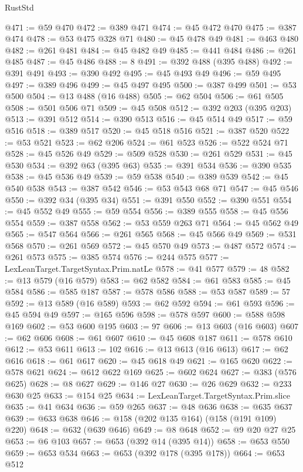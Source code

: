 \begin{lexlean}{RustStd}
\begin{coremodule}
@471 := @59 @470
@472 := @389 @471
@474 := @45 @472 @470
@475 := @387 @474
@478 := @53 @475 @328 @71
@480 := @45 @478 @49
@481 := @463 @480
@482 := @261 @481
@484 := @45 @482 @49
@485 := @441 @484
@486 := @261 @485
@487 := @45 @486
@488 := 8
@491 := @392 @488 (@395 @488)
@492 := @391 @491
@493 := @390 @492
@495 := @45 @493 @49
@496 := @59 @495
@497 := @389 @496
@499 := @45 @497 @495
@500 := @387 @499
@501 := @53 @500
@504 := @13 @488 (@16 @488)
@505 := @62 @504
@506 := @61 @505
@508 := @501 @506 @71
@509 := @45 @508
@512 := @392 @203 (@395 @203)
@513 := @391 @512
@514 := @390 @513
@516 := @45 @514 @49
@517 := @59 @516
@518 := @389 @517
@520 := @45 @518 @516
@521 := @387 @520
@522 := @53 @521
@523 := @62 @206
@524 := @61 @523
@526 := @522 @524 @71
@528 := @45 @526 @49
@529 := @509 @528
@530 := @261 @529
@531 := @45 @530
@534 := @392 @63 (@395 @63)
@535 := @391 @534
@536 := @390 @535
@538 := @45 @536 @49
@539 := @59 @538
@540 := @389 @539
@542 := @45 @540 @538
@543 := @387 @542
@546 := @53 @543 @68 @71
@547 := @45 @546
@550 := @392 @34 (@395 @34)
@551 := @391 @550
@552 := @390 @551
@554 := @45 @552 @49
@555 := @59 @554
@556 := @389 @555
@558 := @45 @556 @554
@559 := @387 @558
@562 := @53 @559 @263 @71
@564 := @45 @562 @49
@565 := @547 @564
@566 := @261 @565
@568 := @45 @566 @49
@569 := @531 @568
@570 := @261 @569
@572 := @45 @570 @49
@573 := @487 @572
@574 := @261 @573
@575 := @385 @574
@576 := @244 @575
@577 := LexLeanTarget.TargetSyntax.Prim.natLe
@578 := @41 @577
@579 := 48
@582 := @13 @579 (@16 @579)
@583 := @62 @582
@584 := @61 @583
@585 := @45 @584
@586 := @585 @187
@587 := @578 @586
@588 := @53 @587
@589 := 57
@592 := @13 @589 (@16 @589)
@593 := @62 @592
@594 := @61 @593
@596 := @45 @594 @49
@597 := @165 @596
@598 := @578 @597
@600 := @588 @598 @169
@602 := @53 @600 @195
@603 := 97
@606 := @13 @603 (@16 @603)
@607 := @62 @606
@608 := @61 @607
@610 := @45 @608 @187
@611 := @578 @610
@612 := @53 @611
@613 := 102
@616 := @13 @613 (@16 @613)
@617 := @62 @616
@618 := @61 @617
@620 := @45 @618 @49
@621 := @165 @620
@622 := @578 @621
@624 := @612 @622 @169
@625 := @602 @624
@627 := @383 (@576 @625)
@628 := @8 @627
@629 := @146 @27
@630 := @26 @629
@632 := @233 @630 @25
@633 := @154 @25
@634 := LexLeanTarget.TargetSyntax.Prim.slice
@635 := @41 @634
@636 := @59 @265
@637 := @48 @636
@638 := @635 @637
@639 := @633 @638
@646 := @158 (@202 @135 @164) (@158 (@191 @109) @220)
@648 := @632 (@639 @646)
@649 := @8 @648
@652 := @9 @20 @27 @25
@653 := @6 @103
@657 := @653 (@392 @14 (@395 @14))
@658 := @653 @550
@659 := @653 @534
@663 := @653 (@392 @178 (@395 @178))
@664 := @653 @512

\end{coremodule}
\end{lexlean}
